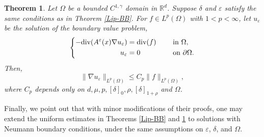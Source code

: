 \documentclass[reqno,12pt]{amsart} %
\newtheorem{theorem}{Theorem}[section]
\theoremstyle{definition}
\theoremstyle{remark}
\numberwithin{equation}{section}
\newcommand{\R}{\mathbb{R}}
\newcommand{\e}{\varepsilon}
\begin{document}
\begin{theorem}\label{W1p-1}
    Let $\Omega$ be a bounded $C^{1, \gamma}$ domain in $\R^d$.
    Suppose $\delta$ and $\e$ satisfy the same conditions as in Theorem \ref{Lip-BB}.
    For $f\in L^p(\Omega)$ with $1< p< \infty$, let $u_\e$ be the solution of the boundary value problem,
    \begin{equation*}
    \left\{
    \aligned
    -\text{\rm div} (A^\e (x) \nabla u_\e)
    &=\text{\rm div}(f) & \quad & \text{ in } \Omega,\\
    u_\e & =0 & \quad & \text{ on } \partial\Omega.
    \endaligned
    \right.
    \end{equation*}
    Then,
    \begin{equation*}
        \|\nabla u_\e \|_{L^p (\Omega)}
        \le C_p \| f \|_{L^p(\Omega)},
    \end{equation*}
    where $C_p$ depends only on $d, \mu, p, [\delta]_0, \rho, [\delta]_{1+\rho}$ and $\Omega$. 
\end{theorem}

   Finally, we point out that with minor modifications of their proofs,
   one may extend the uniform estimates
   in Theorems \ref{Lip-BB} and \ref{W1p-1} to solutions with Neumann boundary conditions,
   under the same assumptions on $\e$, $\delta$, and $\Omega$.
 


\end{document}
